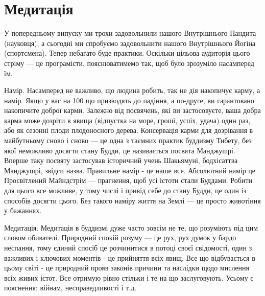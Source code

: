 \section{Медитація}

У попередньому випуску ми трохи задовольнили нашого Внутрішнього Пандита (науковця),
а сьогодні ми спробуємо задовольнити нашого Внутрішнього Йогіна (спортсмена).
Тепер небагато буде практики. Оскільки цільова аудиторія цього стріму ---
це програмісти, пояснюватимемо так, щоб було зрозуміло насамперед їм.

Намір. Насамперед не важливо, що людина робить, так не дія накопичує карму, а намір.
Якщо у вас на 100%
що призводять до падіння, а по-друге, ви гарантовано накопичите доброї карми.
Залежно від посвячень, які ви застосовуєте, ваша добра карма може дозріти в
явища (відпустка на море, гроші, успіх, удача) один раз, або як сезонні плоди
плодоносного дерева. Консервація карми для дозрівання в майбутньому сново і сново ---
це одна з таємних практик буддизму Тибету, без якої неможливо досягти стану Будди,
це називається посвята Манджушрі. Вперше таку посвяту застосував історичний учень
Шакьямуні, бодхісаттва Манджушрі, звідси назва. Правильне намір - це наше все.
Абсолютний намір це Просвітлений Майндстрім --- прагнення, щоб усі істоти стали Буддами.
Робити для цього все можливе, у тому числі і привід себе до стану Будди, це один із
способів досягти цього. Без такого наміру життя на Землі --- це просто животіння у бажаннях.

Медитація. Медитація в буддизмі дуже часто зовсім не те, що розуміють під
цим словом обивателі. Природний спокій розуму --- це рух, рух думок у бардо
неспання, тому єдиний спосіб це розчинитися в потоці своєї свідомості, один
з важливих і ключових моментів - це прийняття всіх явищ. Все що відбувається
в цьому світі - це природний прояв законів причини та наслідки щодо мислення
всіх живих істот. Все отримую рівно стільки і те на що заслуговують.
Усьому є пояснення: війнам, несправедливості і т.д.

